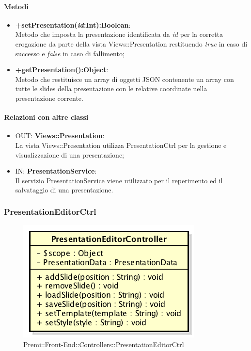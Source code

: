 	\paragraph{Metodi}
	\begin{itemize}
	  \item \textbf{+setPresentation(\textit{id}:Int):Boolean}:\\
		  Metodo che imposta la presentazione identificata da  \textit{id} per la corretta erogazione da parte della vista Views::Presentation restituendo \textit{true} in caso di successo e \textit{false} in caso di fallimento;
	  \item \textbf{+getPresentation():Object}:\\
		  Metodo che restituisce un array di oggetti JSON contenente un array con tutte le slides della presentazione con le relative coordinate nella presentazione corrente.
		  
	\end{itemize}
	\paragraph{Relazioni con altre classi}
	\begin{itemize}
	  \item OUT: \textbf{Views::Presentation}:\\
		La vista Views::Presentation utilizza PresentationCtrl per la gestione e visualizzazione di una presentazione;
	  \item IN: \textbf{PresentationService}: \\
	  	Il servizio PresentationService viene utilizzato per il reperimento ed il salvataggio di una presentazione.
	\end{itemize}
	
\newpage	
\subsubsection{PresentationEditorCtrl}
\begin{figure}[h]
	\centering
	\includegraphics[width=0.5\linewidth]{img/premi_front_end_controllers_presentationeditorcontroller}
	\caption[Premi::Front-End::Controllers::PresentationEditorCtrl]{Premi::Front-End::Controllers::PresentationEditorCtrl}
\end{figure}

